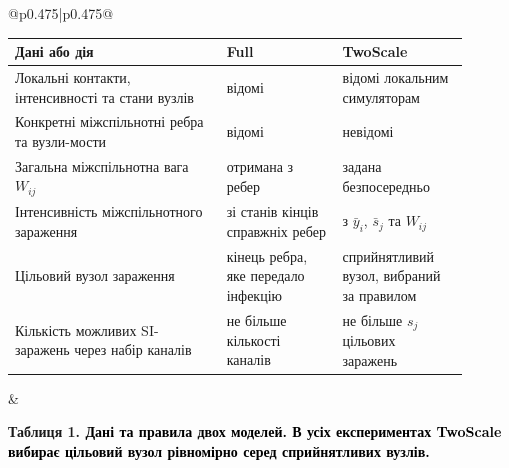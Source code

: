 \documentclass[11pt]{article}
\newcommand{\ibar}{\bar{y}}
\newcommand{\sbar}{\bar{s}}
\newcommand{\Full}{\textnormal{Full}}
\newcommand{\TS}{\textnormal{TwoScale}}
\begin{document}
\begin{longtable}{@{}p{0.475\textwidth}|p{0.475\textwidth}@{}}
\begin{minipage}[t]{\linewidth}
\begin{minipage}{\linewidth}
\small
\setlength{\tabcolsep}{3pt}\begin{tabular}{>{\raggedright\arraybackslash}p{0.42\linewidth}>{\raggedright\arraybackslash}p{0.23\linewidth}>{\raggedright\arraybackslash}p{0.25\linewidth}}
\toprule
Дані або дія & \Full{} & \TS{}\\
\midrule
Локальні контакти, інтенсивності та стани вузлів & відомі & відомі локальним симуляторам\\
Конкретні міжспільнотні ребра та вузли-мости & відомі & невідомі\\
Загальна міжспільнотна вага $W_{ij}$ & отримана з ребер & задана безпосередньо\\
Інтенсивність міжспільнотного зараження & зі станів кінців справжніх ребер & з $\ibar_i$, $\sbar_j$ та $W_{ij}$\\
Цільовий вузол зараження & кінець ребра, яке передало інфекцію & сприйнятливий вузол, вибраний за правилом\\
Кількість можливих SI-заражень через набір каналів & не більше кількості каналів & не більше $s_j$ цільових заражень\\
\bottomrule
\end{tabular}
\end{minipage}\par
\end{minipage} &
\begin{minipage}[t]{\linewidth}
\par\noindent\begin{minipage}{\linewidth}
\color{black}\centering
\par\small\textbf{Таблиця 1. \textcolor{black}{Дані та правила двох моделей. В усіх експериментах \TS{} вибирає цільовий вузол рівномірно серед сприйнятливих вузлів.}}


\end{minipage}
\end{minipage}
\end{longtable}
\end{document}
